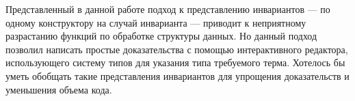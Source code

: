 \startconclusionpage
Представленный в данной работе подход к представлению инвариантов —
по одному конструктору на случай инварианта —
приводит к неприятному разрастанию функций по обработке структуры данных.
Но данный подход позволил написать простые доказательства
с помощью интерактивного редактора, использующего систему типов
для указания типа требуемого терма.
Хотелось бы уметь обобщать такие представления инвариантов для
упрощения доказательств и уменьшения объема кода.
